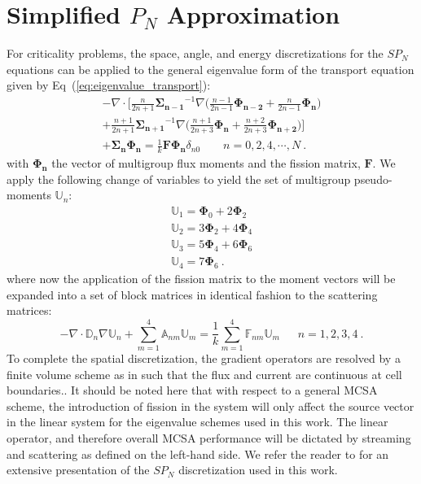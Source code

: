 \documentclass[letterpaper,11pt]{article}
\begin{document}
\section{Simplified $P_N$ Approximation}
For criticality problems, the space, angle, and energy discretizations
for the $SP_N$ equations can be applied to the general eigenvalue form
of the transport equation given by
Eq~(\ref{eq:eigenvalue_transport}):
\begin{multline}
  -\nabla \cdot \Bigg[\frac{n}{2n+1}\mathbf{\Sigma_{n-1}}^{-1} \nabla
    \Big(\frac{n-1}{2n-1} \mathbf{\Phi_{n-2}} +
    \frac{n}{2n-1}\mathbf{\Phi_n} \Big) \\+
    \frac{n+1}{2n+1}\mathbf{\Sigma_{n+1}}^{-1} \nabla
    \Big(\frac{n+1}{2n+3}\mathbf{\Phi_n} +
    \frac{n+2}{2n+3}\mathbf{\Phi_{n+2}}\Big) \Bigg] \\+
  \mathbf{\Sigma_n} \mathbf{\Phi_n} = \frac{1}{k} \mathbf{F}
  \mathbf{\Phi_n} \delta_{n0} \ \ \ \ \ \ \ \ \ n = 0,2,4,\cdots,N\:.
  \label{eq:multigroup_spn_eigenvalue}
\end{multline}
with $\mathbf{\Phi_n}$ the vector of multigroup flux moments and the
fission matrix, $\mathbf{F}$. We apply the following change of
variables to yield the set of multigroup pseudo-moments
$\mathbb{U}_n$:
\begin{subequations}
  \begin{gather}
    \mathbb{U}_1 = \mathbf{\Phi}_0 + 2\mathbf{\Phi}_2 \\
    \mathbb{U}_2 = 3\mathbf{\Phi}_2 + 4\mathbf{\Phi}_4 \\
    \mathbb{U}_3 = 5\mathbf{\Phi}_4 + 6\mathbf{\Phi}_6 \\
    \mathbb{U}_4 = 7\mathbf{\Phi}_6 \:.
  \end{gather}
  \label{eq:spn7_subs}
\end{subequations}
where now the application of the fission matrix to the moment vectors
will be expanded into a set of block matrices in identical fashion to
the scattering matrices:
\begin{equation}
  -\nabla \cdot \mathbb{D}_n \nabla \mathbb{U}_n + \sum_{m=1}^4
  \mathbb{A}_{nm} \mathbb{U}_m = \frac{1}{k} \sum_{m=1}^4
  \mathbb{F}_{nm} \mathbb{U}_m\ \ \ \ \ \ \ n = 1,2,3,4\:.
  \label{eq:spn_fission_matrix}
\end{equation}
To complete the spatial discretization, the gradient operators are
resolved by a finite volume scheme as in \cite{hamilton_2014} such
that the flux and current are continuous at cell boundaries.. It
should be noted here that with respect to a general MCSA scheme, the
introduction of fission in the system will only affect the source
vector in the linear system for the eigenvalue schemes used in this
work. The linear operator, and therefore overall MCSA performance will
be dictated by streaming and scattering as defined on the left-hand
side. We refer the reader to \cite{hamilton_2014} for an extensive
presentation of the $SP_N$ discretization used in this work.
\end{document}
